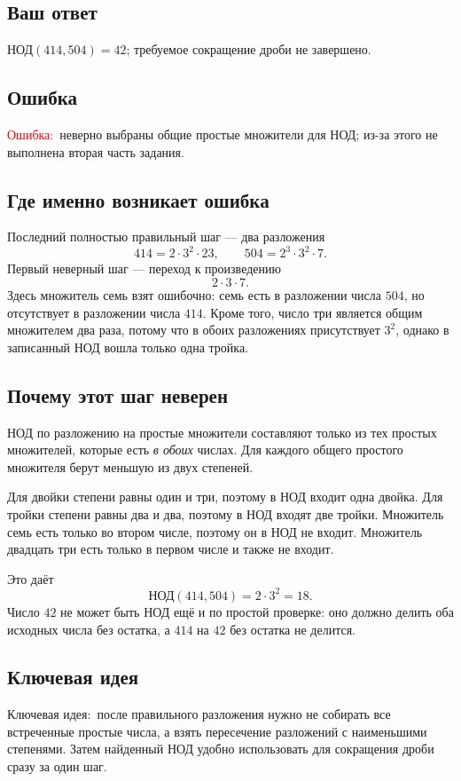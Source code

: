 \documentclass[12pt,a4paper]{article}
\newcommand{\ErrorLabel}{\textcolor{red}{Ошибка:}}
\newcommand{\KeyIdea}{\textcolor{blue!60!black}{Ключевая идея:}}
\begin{document}
\subsection*{Ваш ответ}
$\text{НОД}(414,504)=42$; требуемое сокращение дроби не завершено.

\subsection*{Ошибка}
\ErrorLabel\ неверно выбраны общие простые множители для НОД; из-за этого не выполнена вторая часть задания.

\subsection*{Где именно возникает ошибка}
Последний полностью правильный шаг --- два разложения
\[
414=2\cdot3^2\cdot23,
\qquad
504=2^3\cdot3^2\cdot7.
\]
Первый неверный шаг --- переход к произведению
\[
2\cdot3\cdot7.
\]
Здесь множитель семь взят ошибочно: семь есть в разложении числа $504$, но отсутствует в разложении числа $414$. Кроме того, число три является общим множителем два раза, потому что в обоих разложениях присутствует $3^2$, однако в записанный НОД вошла только одна тройка.

\subsection*{Почему этот шаг неверен}
НОД по разложению на простые множители составляют только из тех простых множителей, которые есть \emph{в обоих} числах. Для каждого общего простого множителя берут меньшую из двух степеней.

Для двойки степени равны один и три, поэтому в НОД входит одна двойка. Для тройки степени равны два и два, поэтому в НОД входят две тройки. Множитель семь есть только во втором числе, поэтому он в НОД не входит. Множитель двадцать три есть только в первом числе и также не входит.

Это даёт
\[
\text{НОД}(414,504)=2\cdot3^2=18.
\]
Число $42$ не может быть НОД ещё и по простой проверке: оно должно делить оба исходных числа без остатка, а $414$ на $42$ без остатка не делится.

\subsection*{Ключевая идея}
\KeyIdea\ после правильного разложения нужно не собирать все встреченные простые числа, а взять пересечение разложений с наименьшими степенями. Затем найденный НОД удобно использовать для сокращения дроби сразу за один шаг.
\end{document}
